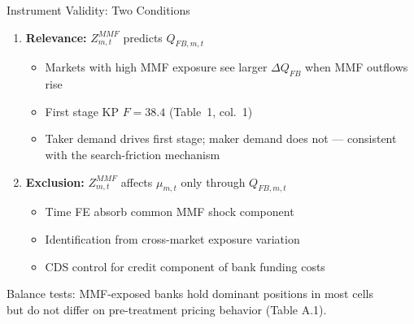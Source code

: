 \documentclass[aspectratio=169, 10pt]{beamer}
\begin{document}
\begin{frame}{Instrument Validity: Two Conditions}

  \begin{enumerate}
    \item \textbf{Relevance:} $Z_{m,t}^{MMF}$ predicts $Q_{FB,m,t}$
    \begin{itemize}
      \item Markets with high MMF exposure see larger $\Delta Q_{FB}$ when MMF outflows rise
      \item First stage KP $F = 38.4$ (Table~1, col.~1)
      \item Taker demand drives first stage; maker demand does not --- consistent with the
            search-friction mechanism
    \end{itemize}

    \bigskip

    \item \textbf{Exclusion:} $Z_{m,t}^{MMF}$ affects $\mu_{m,t}$ only through $Q_{FB,m,t}$
    \begin{itemize}
      \item Time FE absorb common MMF shock component
      \item Identification from cross-market exposure variation
      \item CDS control for credit component of bank funding costs
    \end{itemize}
  \end{enumerate}

  \bigskip

  \begin{center}
    {\color{dimgray}\small
      Balance tests: MMF-exposed banks hold dominant positions in most cells\\
      but do not differ on pre-treatment pricing behavior (Table A.1).}
  \end{center}

\end{frame}
\end{document}
